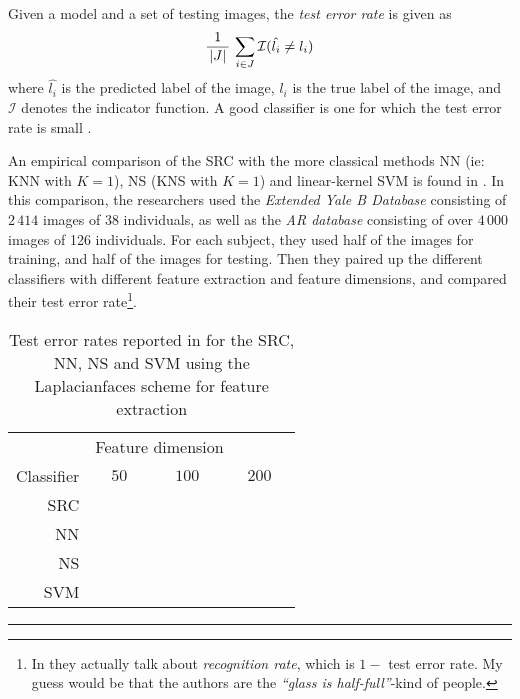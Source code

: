 Given a model and a set of testing images, the \textit{test error rate} is given as
\begin{equation}
	\label{eq:errorrate}
	\dfrac{1}{\,\left|J\right|\,} \, \sum_{i\in J} \mathcal{I}(\hat{l_{i}} \neq l_{i})
\end{equation}
where $ \hat{l_{i}} $ is the predicted label of the image, $ l_{i} $ is the true label of the image, and $ \mathcal{I} $ denotes the indicator function. A good classifier is one for which the test error rate is small \cite[Section~2.2]{ISLR}.

An empirical comparison of the SRC with the more classical methods NN (ie: KNN with $ K = 1 $), NS (KNS with $ K=1 $) and linear-kernel SVM is found in \cite{wright09facerecog}. In this comparison, the researchers used the \textit{Extended Yale B Database} consisting of $ 2\,414 $ images of $ 38 $ individuals, as well as the \textit{AR database} consisting of over $ 4\,000 $ images of 126 individuals. For each subject, they used half of the images for training, and half of the images for testing. Then they paired up the different classifiers with different feature extraction and feature dimensions, and compared their test error rate\footnote{In \cite{wright09facerecog} they actually talk about \textit{recognition rate}, which is $ 1 - $ test error rate. My guess would be that the authors are the \textit{``glass is half-full''}-kind of people.}.

\begin{table}[t]
	\centering
	\renewcommand{\arraystretch}{1.2}
	\begin{tabular}{r | c c c}
		           & \multicolumn{3}{l}{\quad Feature dimension}                    \\
		Classifier & $ \quad50\quad $ & $ \quad100\quad $ & $ \quad200\quad $ \\ \hline
		       SRC &                  &                   &  \\
		        NN &                  &                   &  \\
		        NS &                  &                   &  \\
		       SVM &                  &                   &
	\end{tabular}
	\renewcommand{\arraystretch}{1}
	\caption{Test error rates reported in \cite{wright09facerecog} for the SRC, NN, NS and SVM using the Laplacianfaces scheme for feature extraction}
	\label{table:errorrates}
	\vspace{4pt}\hrule
\end{table}

